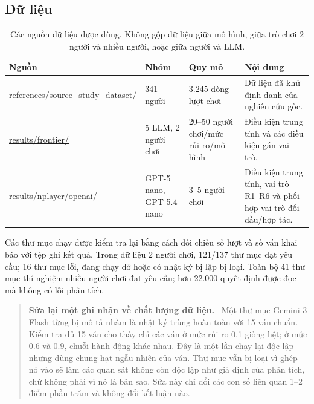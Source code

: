 \documentclass[11pt]{article}
\newenvironment{luuy}[1][Lưu ý]
  {\begin{quote}\small\color{slate}\textbf{#1.}\ }
  {\end{quote}}
\begin{document}
\subsection{Dữ liệu}
\begin{table}[H]\centering\small
\begin{tabular}{@{}p{3.9cm}p{2.9cm}p{1.8cm}p{5.8cm}@{}}\toprule
\textbf{Nguồn} & \textbf{Nhóm} & \textbf{Quy mô} & \textbf{Nội dung}\\\midrule
\url{references/source_study_dataset/} & 341 người & 3.245 dòng lượt chơi & Dữ liệu đã khử định danh của nghiên cứu gốc.\\
\url{results/frontier/} & 5 LLM, 2 người chơi & 20--50 người chơi/mức rủi ro/mô hình & Điều kiện trung tính và các điều kiện gán vai trò.\\
\url{results/nplayer/openai/} & GPT-5 nano, GPT-5.4 nano & 3--5 người chơi & Điều kiện trung tính, vai trò R1--R6 và phối hợp vai trò đối đầu/hợp tác.\\
\bottomrule\end{tabular}
\caption{Các nguồn dữ liệu được dùng. Không gộp dữ liệu giữa mô hình, giữa trò chơi 2 người và nhiều người, hoặc giữa người và LLM.}
\label{tab:data-sources}\end{table}

Các thư mục chạy được kiểm tra lại bằng cách đối chiếu số lượt và số ván khai
báo với tệp ghi kết quả. Trong dữ liệu 2 người chơi, 121/137 thư mục đạt yêu
cầu; 16 thư mục lỗi, đang chạy dở hoặc có nhật ký bị lặp bị loại. Toàn bộ 41
thư mục thí nghiệm nhiều người chơi đạt yêu cầu; hơn 22.000 quyết định được đọc
mà không có lỗi phân tích.

\begin{luuy}[Sửa lại một ghi nhận về chất lượng dữ liệu]
Một thư mục Gemini 3 Flash từng bị mô tả nhầm là nhật ký trùng hoàn toàn với 15
ván chuẩn. Kiểm tra đủ 15 ván cho thấy chỉ các ván ở mức rủi ro 0.1 giống hệt;
ở mức 0.6 và 0.9, chuỗi hành động khác nhau. Đây là một lần chạy lại độc lập
nhưng dùng chung hạt ngẫu nhiên của ván. Thư mục vẫn bị loại vì ghép nó vào sẽ
làm các quan sát không còn độc lập như giả định của phân tích, chứ không phải vì
nó là bản sao. Sửa này chỉ đổi các con số liên quan 1--2 điểm phần trăm và không
đổi kết luận nào.
\end{luuy}
\end{document}
